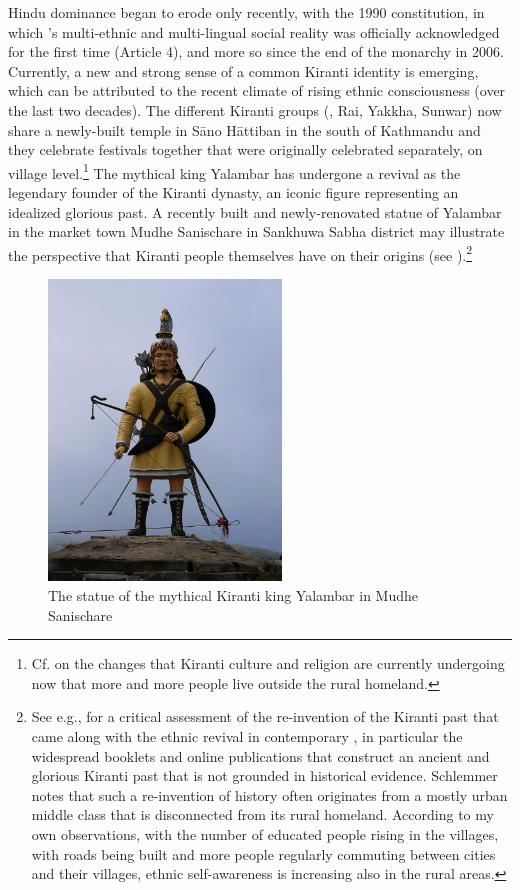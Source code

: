 Hindu dominance began to erode only recently, with the 1990 constitution, in which 's multi-ethnic and multi-lingual social reality was officially acknowledged for the first time (Article 4), and more so since the end of the monarchy in 2006. Currently, a new and strong sense of a common Kiranti identity is emerging, which can be attributed to the recent climate of rising ethnic consciousness (over the last two decades). The different Kiranti groups (, Rai, Yakkha, Sunwar) now share a newly-built temple in Sāno Hāttiban in the south of Kathmandu and they celebrate festivals together that were originally celebrated separately, on
village level.\footnote{Cf. \citet{Gaenszle_Redefining} on the changes that Kiranti culture and religion are currently undergoing now that more and more people live outside the rural homeland.}  The mythical king Yalambar has undergone a revival as the legendary founder of the Kiranti dynasty, an iconic figure representing an idealized glorious past. A recently built and newly-renovated statue of Yalambar in the market town Mudhe Sanischare in Sankhuwa Sabha district may illustrate the perspective that Kiranti people themselves have on their origins (see ).\footnote{See e.g., \citet{Schlemmer2003_New} for a critical assessment of the re-invention of the Kiranti past that came along with the ethnic revival in contemporary , in particular the widespread booklets and online publications that construct an ancient and glorious Kiranti past that is not grounded in historical evidence. Schlemmer notes that such a re-invention of history often originates from a mostly urban middle class that is disconnected from its rural homeland. According to my own observations, with the number of educated people rising in the villages, with roads being built and more people regularly commuting between cities and their villages, ethnic self-awareness is increasing also in the rural areas.}

\begin{figure}
\centering
\includegraphics[height=8cm]{figures/yalambar.jpg}
\caption{The statue of the mythical Kiranti king Yalambar in Mudhe Sanischare}\label{yalambar}
\end{figure}


